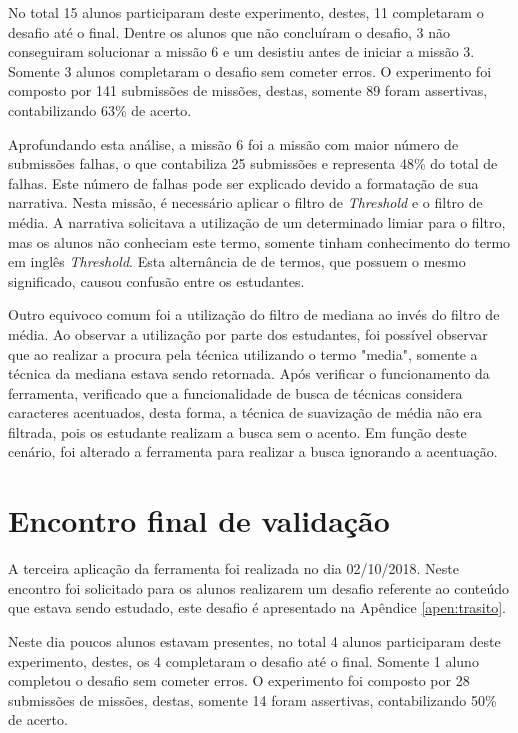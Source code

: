 \documentclass[
	12pt,				%
	oneside,			%
	a4paper,			%
	english,			%
	french,				%
	spanish,			%
	brazil,				%
	]{abntex2}
\begin{document}
No total 15 alunos participaram deste experimento, destes, 11 completaram o desafio até o final. Dentre os alunos que não concluíram o desafio, 3 não conseguiram solucionar a missão 6 e um desistiu antes de iniciar a missão 3. Somente 3 alunos completaram o desafio sem cometer erros. O experimento foi composto por 141 submissões de missões, destas, somente 89 foram assertivas, contabilizando 63\% de acerto.

Aprofundando esta análise, a missão 6 foi a missão com maior número de submissões falhas, o que contabiliza 25 submissões e representa 48\% do total de falhas. Este número de falhas pode ser explicado devido a formatação de sua narrativa. Nesta missão, é necessário aplicar o filtro de \textit{Threshold} e o filtro de média. A narrativa solicitava a utilização de um determinado limiar para o filtro, mas os alunos não conheciam este termo, somente tinham conhecimento do termo em inglês \textit{Threshold}. Esta alternância de de termos, que possuem o mesmo significado, causou confusão entre os estudantes. 

Outro equivoco comum foi a utilização do filtro de mediana ao invés do filtro de média. Ao observar a utilização por parte dos estudantes, foi possível observar que ao realizar a procura pela técnica utilizando o termo "media", somente a técnica da mediana estava sendo retornada. Após verificar o funcionamento da ferramenta, verificado que a funcionalidade de busca de técnicas considera caracteres acentuados, desta forma, a técnica de suavização de média não era filtrada, pois os estudante realizam a busca sem o acento. Em função deste cenário, foi alterado a ferramenta para realizar a busca ignorando a acentuação. 

\section{Encontro final de validação}
\label{sec:validacaoEncontroFinal}

A terceira aplicação da ferramenta foi realizada no dia 02/10/2018. Neste encontro foi solicitado para os alunos realizarem um desafio referente ao conteúdo que estava sendo estudado, este desafio é apresentado na Apêndice \ref{apen:trasito}. 

Neste dia poucos alunos estavam presentes, no total 4 alunos participaram deste experimento, destes, os 4 completaram o desafio até o final. Somente 1 aluno completou o desafio sem cometer erros. O experimento foi composto por 28 submissões de missões, destas, somente 14 foram assertivas, contabilizando 50\% de acerto.
\end{document}

